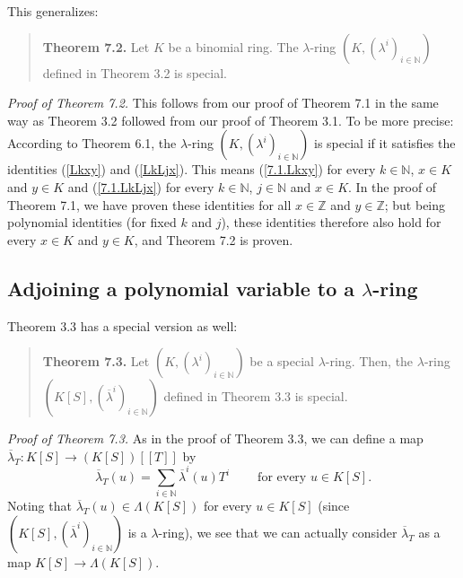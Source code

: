 \documentclass[numbers=enddot,12pt,final,onecolumn,notitlepage]{scrartcl}%
\begin{document}
This generalizes:

\begin{quote}
\textbf{Theorem 7.2.} Let $K$ be a binomial ring. The $\lambda$-ring $\left(
K,\left(  \lambda^{i}\right)  _{i\in\mathbb{N}}\right)  $ defined in Theorem
3.2 is special.
\end{quote}

\textit{Proof of Theorem 7.2.} This follows from our proof of Theorem 7.1 in
the same way as Theorem 3.2 followed from our proof of Theorem 3.1. To be more
precise: According to Theorem 6.1, the $\lambda$-ring $\left(  K,\left(
\lambda^{i}\right)  _{i\in\mathbb{N}}\right)  $ is special if it satisfies the
identities (\ref{Lkxy}) and (\ref{LkLjx}). This means (\ref{7.1.Lkxy}) for
every $k\in\mathbb{N}$, $x\in K$ and $y\in K$ and (\ref{7.1.LkLjx}) for every
$k\in\mathbb{N}$, $j\in\mathbb{N}$ and $x\in K$. In the proof of Theorem 7.1,
we have proven these identities for all $x\in\mathbb{Z}$ and $y\in\mathbb{Z}$;
but being polynomial identities (for fixed $k$ and $j$), these identities
therefore also hold for every $x\in K$ and $y\in K$, and Theorem 7.2 is proven.

\subsection{Adjoining a polynomial variable to a $\lambda$-ring}

Theorem 3.3 has a special version as well:

\begin{quote}
\textbf{Theorem 7.3.} Let $\left(  K,\left(  \lambda^{i}\right)
_{i\in\mathbb{N}}\right)  $ be a special $\lambda$-ring. Then, the $\lambda
$-ring $\left(  K\left[  S\right]  ,\left(  \overline{\lambda}^{i}\right)
_{i\in\mathbb{N}}\right)  $ defined in Theorem 3.3 is special.
\end{quote}

\textit{Proof of Theorem 7.3.} As in the proof of Theorem 3.3, we can define a
map $\overline{\lambda}_{T}:K\left[  S\right]  \rightarrow\left(  K\left[
S\right]  \right)  \left[  \left[  T\right]  \right]  $ by
\[
\overline{\lambda}_{T}\left(  u\right)  =\sum\limits_{i\in\mathbb{N}}%
\overline{\lambda}^{i}\left(  u\right)  T^{i}\ \ \ \ \ \ \ \ \ \ \text{for
every }u\in K\left[  S\right]  .
\]
Noting that $\overline{\lambda}_{T}\left(  u\right)  \in\Lambda\left(
K\left[  S\right]  \right)  $ for every $u\in K\left[  S\right]  $ (since
$\left(  K\left[  S\right]  ,\left(  \overline{\lambda}^{i}\right)
_{i\in\mathbb{N}}\right)  $ is a $\lambda$-ring), we see that we can actually
consider $\overline{\lambda}_{T}$ as a map $K\left[  S\right]  \rightarrow
\Lambda\left(  K\left[  S\right]  \right)  $.
\end{document}
